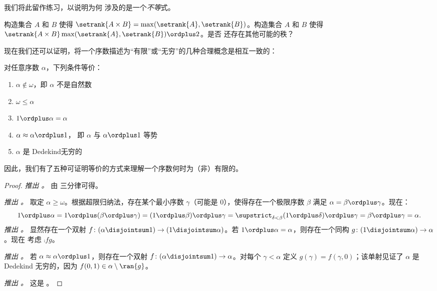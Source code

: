 \documentclass[../../../include/open-logic-section]{subfiles}
\begin{document}
\noindent
我们将此留作练习，以说明为何  涉及的是一个\emph{不等}式。


\begin{prob}
构造集合 $A$ 和 $B$ 使得 $\setrank{A \times B}=
\max(\setrank{A}, \setrank{B})$。构造集合 $A$ 和 $B$ 使得
$\setrank{A \times B}\max(\setrank{A}, \setrank{B}) \ordplus  2$。是否
还存在其他可能的秩？
\end{prob}



现在我们还可以证明，将一个序数描述为“有限”或“无穷”的几种合理概念是相互一致的：


\begin{lem}
对任意序数 $\alpha$，下列条件等价：
\begin{enumerate}
	\item{} $\alpha\notin \omega$，即 $\alpha$ 不是自然数
	\item{} $\omega \leq \alpha$
	\item{} $1 \ordplus  \alpha = \alpha$
	\item{} $\alpha \approx \alpha\ordplus 1$，
	即 $\alpha$ 与 $\alpha\ordplus 1$ 等势
	\item{} $\alpha$ 是 Dedekind无穷的
	\end{enumerate}
\end{lem}


\noindent
因此，我们有了五种可证明等价的方式来理解一个序数何时为（非）有限的。


\begin{proof}
\emph{ 推出 。} 由
三分律可得。

\emph{ 推出 。} 取定
$\alpha \geq \omega$。根据超限归纳法，存在某个最小序数 $\gamma$（可能是 $0$），使得存在一个极限序数
$\beta$ 满足 $\alpha = \beta \ordplus \gamma$。现在：
\[
	1 \ordplus \alpha =
	1 \ordplus (\beta \ordplus \gamma) =
	(1 \ordplus \beta) \ordplus \gamma =
	\supstrict_{\delta < \beta} (1 \ordplus  \delta) \ordplus  \gamma =
	\beta \ordplus  \gamma =
	\alpha.
\]
\emph{ 推出 。} 显然存在一个双射 $f \colon (\alpha \disjointsum 1) \to (1
\disjointsum \alpha)$。若 $1 \ordplus \alpha = \alpha$，则存在一个同构 $g \colon (1 \disjointsum \alpha) \to \alpha$。现在
考虑 $\comp{f}{g}$。

\emph{ 推出 。} 若
$\alpha \approx \alpha \ordplus 1$，则存在一个双射 $f \colon
(\alpha \disjointsum 1) \to \alpha$。对每个 $\gamma < \alpha$ 定义 $g(\gamma) = f(\gamma, 0)$；该单射见证了 $\alpha$ 是 Dedekind 无穷的，因为 $f(0,1) \in \alpha \setminus \ran{g}$。

\emph{ 推出 。} 这是
。
\end{proof}
\end{document}
